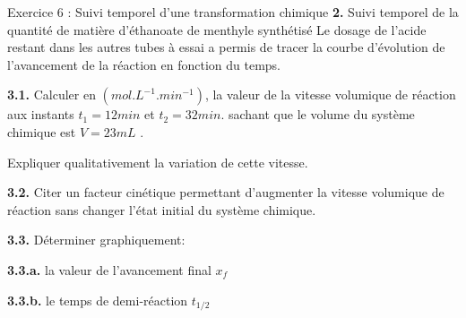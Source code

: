 \documentclass[12pt, french]{article}
\begin{document}
\begin{Box2}{Exercice 6 : Suivi temporel d’une transformation
chimique}
\textbf{2. }Suivi temporel de la quantité de matière d'éthanoate de menthyle synthétisé Le dosage de l'acide restant dans les autres tubes à essai a permis de tracer la courbe d'évolution de
l'avancement de la réaction en fonction du temps.

\textbf{3.1. }Calculer en $(mol.L^{-1}.min^{-1})$, la valeur de la vitesse volumique de réaction aux instants $t_1 = 12 min$ et $t_2 = 32min$. sachant que le volume du système chimique est $V = 23 mL$ . 

Expliquer qualitativement la variation de cette vitesse.


\textbf{3.2. }Citer un facteur cinétique permettant d'augmenter la vitesse volumique de réaction sans changer
l'état initial du système chimique.

\textbf{3.3. }Déterminer graphiquement: 

\textbf{3.3.a. }la valeur de l’avancement final $x_f$

\textbf{3.3.b. }le temps de demi-réaction $t_{1/2}$
\end{Box2}
\end{document}
